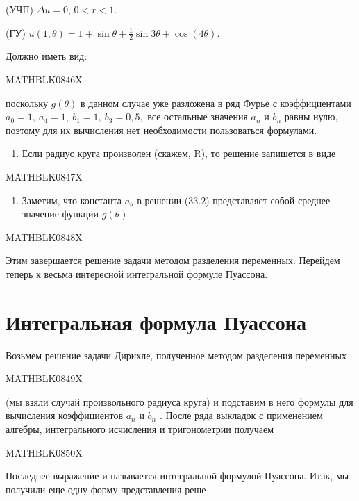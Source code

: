 \documentclass[
  ukrainian,
]{article}
\providecommand{\tightlist}{%
  \setlength{\itemsep}{0pt}\setlength{\parskip}{0pt}}
\begin{document}
(УЧП) \(\Delta u = 0\), \(0 < r < 1\).

(ГУ)
\(u(1, \theta) = 1 + \sin \theta + \frac{1}{2} \sin 3\theta + \cos (4\theta)\).

Должно иметь вид:

MATHBLK0846X

поскольку \(g(\theta)\) в данном случае уже разложена в ряд Фурье с
коэффициентами \(a_0=1,\ a_4=1,\ b_1=1,\ b_3=0,5,\) все остальные
значения \(a_n\) и \(b_n\) равны нулю, поэтому для их вычисления нет
необходимости пользоваться формулами.

\begin{enumerate}
\def\labelenumi{\arabic{enumi}.}
\setcounter{enumi}{2}
\tightlist
\item
  Если радиус круга произволен (скажем, R), то решение запишется в виде
\end{enumerate}

MATHBLK0847X

\begin{enumerate}
\def\labelenumi{\arabic{enumi}.}
\setcounter{enumi}{3}
\tightlist
\item
  Заметим, что константа \(a_{\theta}\) в решении (33.2) представляет
  собой среднее значение функции \(g\left(\theta\right)\)
\end{enumerate}

MATHBLK0848X

Этим завершается решение задачи методом разделения переменных. Перейдем
теперь к весьма интересной интегральной формуле Пуассона.

\section{Интегральная формула
Пуассона}\label{ux438ux43dux442ux435ux433ux440ux430ux43bux44cux43dux430ux44f-ux444ux43eux440ux43cux443ux43bux430-ux43fux443ux430ux441ux441ux43eux43dux430}

Возьмем решение задачи Дирихле, полученное методом разделения переменных

MATHBLK0849X

(мы взяли случай произвольного радиуса круга) и подставим в него формулы
для вычисления коэффициентов \(a_n\) и \(b_n\) . После ряда выкладок с
применением алгебры, интегрального исчисления и тригонометрии получаем

MATHBLK0850X

Последнее выражение и называется интегральной формулой Пуассона. Итак,
мы получили еще одну форму представления реше-
\end{document}
